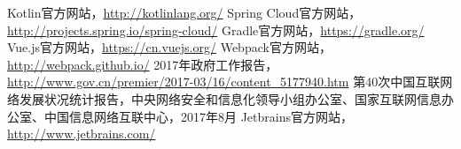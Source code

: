 \documentclass[titlepage,UTF8,linespread=1.5]{ctexart}
\begin{document}
\begin{thebibliography}{99}
     Kotlin官方网站，\url{http://kotlinlang.org/}
     Spring Cloud官方网站，\url{http://projects.spring.io/spring-cloud/}
     Gradle官方网站，\url{https://gradle.org/}
     Vue.js官方网站，\url{https://cn.vuejs.org/}
     Webpack官方网站，\url{http://webpack.github.io/}
     2017年政府工作报告，\url{http://www.gov.cn/premier/2017-03/16/content_5177940.htm}
     第40次中国互联网络发展状况统计报告，中央网络安全和信息化领导小组办公室、国家互联网信息办公室、中国信息网络互联中心，2017年8月
     Jetbrains官方网站，\url{http://www.jetbrains.com/}
\end{thebibliography}
\end{document}
